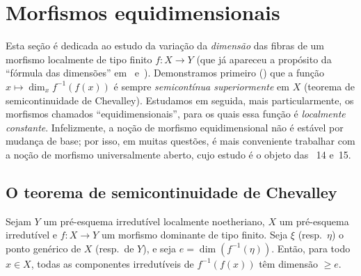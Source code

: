 \section{Morfismos equidimensionais}
\label{section:IV.13}


Esta seção é dedicada ao estudo da variação da \emph{dimensão} das fibras
de um morfismo localmente de tipo finito $f:X\to Y$ (que já apareceu a
propósito da ``fórmula das dimensões'' em~ e~).
Demonstramos primeiro () que a função
$x\mapsto\dim_x f^{-1}(f(x))$ é sempre \emph{semicontínua superiormente}
em $X$ (teorema de semicontinuidade de Chevalley).
Estudamos em seguida, mais particularmente, os morfismos chamados
``equidimensionais'', para os quais essa função é \emph{localmente constante}.
Infelizmente, a noção de morfismo equidimensional não é estável por mudança
de base; por isso, em muitas questões, é mais conveniente trabalhar com a
noção de morfismo universalmente aberto, cujo estudo é o objeto das
\textsection\textsection~14 e~15.

\subsection{O teorema de semicontinuidade de Chevalley}
\label{subsection:IV.13.1}

\begin{lemma}[13.1.1]
\label{IV.13.1.1}
Sejam $Y$ um pré-esquema irredutível localmente noetheriano,
$X$ um pré-esquema irredutível e $f:X\to Y$ um morfismo dominante de tipo finito.
Seja $\xi$ (resp.\ $\eta$) o ponto genérico de $X$ (resp.\ de $Y$),
e seja $e=\dim(f^{-1}(\eta))$.
Então, para todo $x\in X$, todas as componentes irredutíveis de
$f^{-1}(f(x))$ têm dimensão $\geq e$.
\end{lemma}

